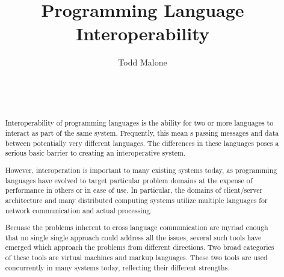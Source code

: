 \documentclass{sig-alternate}
\begin{document}

\title{Programming Language Interoperability}


\author{
\alignauthor
Todd Malone\\
	\\
	\\
	\\
}

\maketitle
\begin{abstract}
Interoperability of programming languages is the ability for two or more languages to interact as part of the same system. Frequently, this mean s passing messages and data between potentially very different languages.
The differences in these languages poses a serious basic barrier to creating an interoperative system.

However, interoperation is important to many existing systems today, as programming languages have evolved to target particular problem domains at the expense of performance in others or in ease of use. In particular, the domains of client/server architecture and many distributed computing systems utilize multiple languages for network communication and actual processing.


Becuase the problems inherent to cross language communication are myriad enough that no single single approach could address all the issues, several such tools have emerged which approach the problems from different directions.
Two broad categories of these tools are virtual machines and markup languages. These two tools are used concurrently in many systems today, reflecting their different strengths.
\end{abstract}

\end{document}
